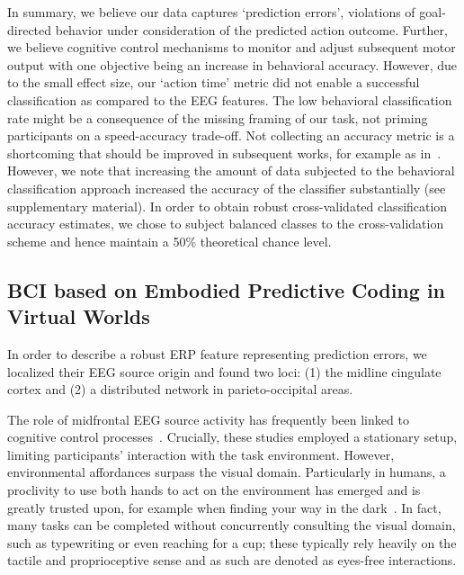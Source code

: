 In summary, we believe our data captures `prediction errors', violations of goal-directed behavior under consideration of the predicted action outcome. Further, we believe cognitive control mechanisms to monitor and adjust subsequent motor output with one objective being an increase in behavioral accuracy. However, due to the small effect size, our `action time' metric did not enable a successful classification as compared to the EEG features. The low behavioral classification rate might be a consequence of the missing framing of our task, not priming participants on a speed-accuracy trade-off. Not collecting an accuracy metric is a shortcoming that should be improved in subsequent works, for example as in~\cite{Purcell2016-li}. However, we note that increasing the amount of data subjected to the behavioral classification approach increased the accuracy of the classifier substantially (see supplementary material). In order to obtain robust cross-validated classification accuracy estimates, we chose to subject balanced classes to the cross-validation scheme and hence maintain a 50\% theoretical chance level.

\subsection{BCI based on Embodied Predictive Coding in Virtual Worlds}

In order to describe a robust ERP feature representing prediction errors, we localized their EEG source origin and found two loci: (1) the midline cingulate cortex and (2) a distributed network in parieto-occipital areas. 

The role of midfrontal EEG source activity has frequently been linked to cognitive control processes~\cites{Ridderinkhof2004-rz, Cavanagh2014-mm, Cooper2019-im}. Crucially, these studies employed a stationary setup, limiting participants' interaction with the task environment. However, environmental affordances surpass the visual domain. Particularly in humans, a proclivity to use both hands to act on the environment has emerged and is greatly trusted upon, for example when finding your way in the dark~\cites{Gehrke2018-jm, Gehrke2021-ml, Miyakoshi2021-ni}. In fact, many tasks can be completed without concurrently consulting the visual domain, such as typewriting or even reaching for a cup; these typically rely heavily on the tactile and proprioceptive sense and as such are denoted as eyes-free interactions.

